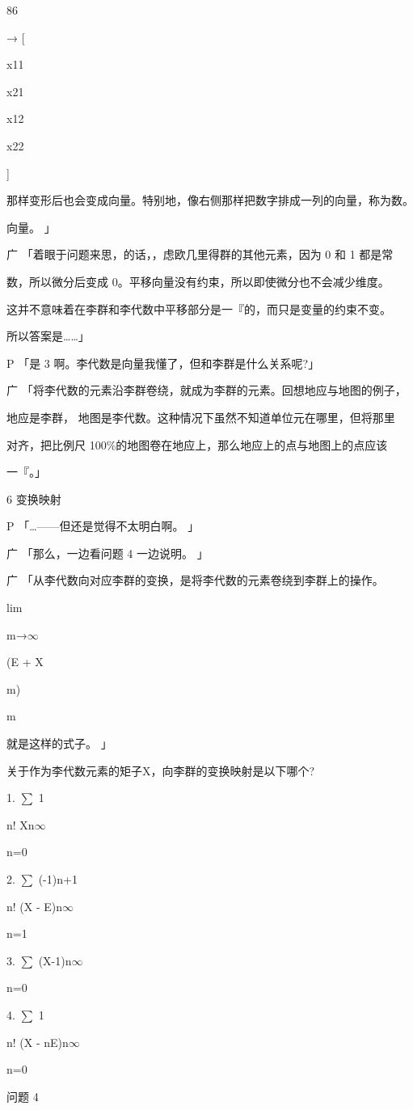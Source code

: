 86\par
[\par
x11 x12\par
x21 x22\par
] → [\par
x11\par
x21\par
x12\par
x22\par
]\par
那样变形后也会变成向量。特别地，像右侧那样把数字排成一列的向量，称为数。\par
向量。 」\par
广 「着眼于问题来思，的话，，虑欧几里得群的其他元素，因为 0 和 1 都是常\par
数，所以微分后变成 0。平移向量没有约束，所以即使微分也不会减少维度。\par
这并不意味着在李群和李代数中平移部分是一『的，而只是变量的约束不变。\par
所以答案是……」\par
P 「是 3 啊。李代数是向量我懂了，但和李群是什么关系呢?」\par
广 「将李代数的元素沿李群卷绕，就成为李群的元素。回想地应与地图的例子，\par
地应是李群， 地图是李代数。这种情况下虽然不知道单位元在哪里，但将那里\par
对齐，把比例尺 100\%的地图卷在地应上，那么地应上的点与地图上的点应该\par
一『。」\par
6 变换映射\par
P 「…——但还是觉得不太明白啊。 」\par
广 「那么，一边看问题 4 一边说明。 」\par
广 「从李代数向对应李群的变换，是将李代数的元素卷绕到李群上的操作。\par
lim\par
m→$\infty$\par
(E + X\par
m)\par
m\par
就是这样的式子。 」\par
关于作为李代数元素的矩子X，向李群的变换映射是以下哪个?\par
1. $\sum$ 1\par
n! Xn$\infty$\par
n=0\par
2. $\sum$ (-1)n+1\par
n! (X - E)n$\infty$\par
n=1\par
3. $\sum$ (X-1)n$\infty$\par
n=0\par
4. $\sum$ 1\par
n! (X - nE)n$\infty$\par
n=0\par
问题 4\par

